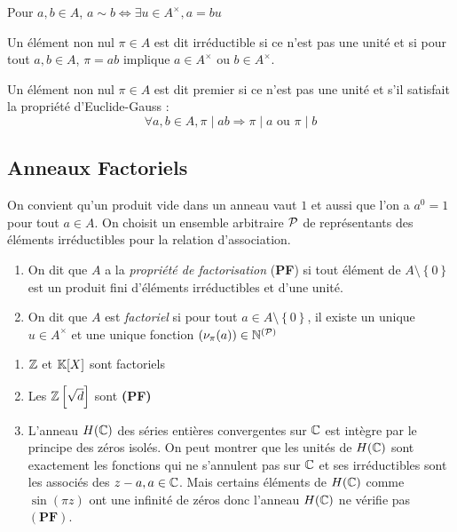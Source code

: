 \documentclass{cours}
\begin{document}
\begin{lemma}
    Pour $a, b \in A$, $a \sim b \Leftrightarrow \exists u \in A^{\times}, a = bu$
\end{lemma}

\begin{definition}
    Un élément non nul $\pi \in A$ est dit irréductible si ce n'est pas une unité et si pour tout $a, b \in A$, $\pi = ab$ implique $a \in A^{\times}$ ou $b\in A^{\times}$.
\end{definition}

\begin{definition}
    Un élément non nul $\pi \in A$ est dit premier si ce n'est pas une unité et s'il satisfait la propriété d'Euclide-Gauss : 
    \[
        \forall a,b \in A, \pi \mid ab \Longrightarrow \pi \mid a \text{ ou } \pi \mid b
    \]
\end{definition}

\subsection{Anneaux Factoriels}
\begin{definition}
    On convient qu'un produit vide dans un anneau vaut $1$ et aussi que l'on a $a^{0} = 1$ pour tout $a \in A$. On choisit un ensemble arbitraire $\mathcal{P}$ de représentants des éléments irréductibles pour la relation d'association. 
\end{definition}

\begin{definition}
    \begin{enumerate}
        \item On dit que $A$ a la \emph{propriété de factorisation} (\textbf{PF}) si tout élément de $A\setminus \left\{0\right\}$ est un produit fini d'éléments irréductibles et d'une unité. 
        \item On dit que $A$ est \emph{factoriel} si pour tout $a \in A\setminus \left\{0\right\}$, il existe un unique $u \in A^{\times}$ et une unique fonction $\left(\nu_{\pi}(a)\right) \in \mathbb{N}^{\left(\mathcal{P}\right)}$
    \end{enumerate}
\end{definition}

\begin{example}
    \begin{enumerate}
        \item $\mathbb{Z}$ et $\mathbb{K}[X]$ sont factoriels
        \item Les $\mathbb{Z}\left[\sqrt{d}\right]$ sont \textbf{(PF)}
        \item L'anneau $H(\mathbb{C})$ des séries entières convergentes sur $\mathbb{C}$ est intègre par le principe des zéros isolés. On peut montrer que les unités de $H(\mathbb{C})$ sont exactement les fonctions qui ne s'annulent pas sur $\mathbb{C}$ et ses irréductibles sont les associés des $z - a, a\in \mathbb{C}$. Mais certains éléments de $H(\mathbb{C})$ comme $\sin\left(\pi z\right)$ ont une infinité de zéros donc l'anneau $H(\mathbb{C})$ ne vérifie pas $\left(\textbf{PF}\right)$.
    \end{enumerate}
\end{example}
\end{document}
